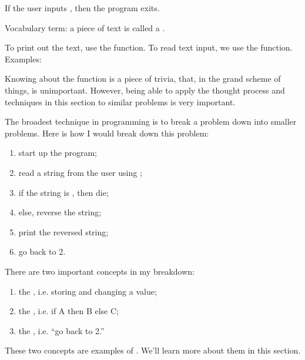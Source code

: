 If the user inputs , then the program exits.

Vocabulary term: a piece of text is called a .

To print out the text, use the  function. To read text
input, we use the  function. Examples:


Knowing about the function  is a piece of trivia, that,
in the grand scheme of things, is unimportant. However, being able to
apply the thought process and techniques in this section to similar
problems is very important.

The broadest technique in programming is to break a problem down into
smaller problems. Here is how I would break down this problem:

\begin{enumerate}
\item start up the program;
\item read a string from the user using ;
\item if the string is , then die;
\item else, reverse the string;
\item print the reversed string;
\item go back to 2.
\end{enumerate}

There are two important concepts in my breakdown:

\begin{enumerate}
\item the , i.e. storing and changing a value;
\item the , i.e. if A then B else C;
\item the , i.e. ``go back to 2.''
\end{enumerate}

These two concepts are examples of . We'll learn more about them in this section.
